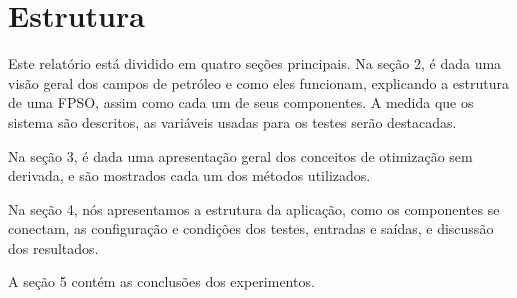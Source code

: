 \section{Estrutura}

Este relatório está dividido em quatro seções principais.
Na seção 2, é dada uma visão geral dos campos de petróleo e como eles funcionam, explicando a estrutura de uma FPSO, assim como cada um de seus componentes. A medida que os sistema são descritos, as variáveis usadas para os testes serão destacadas.

Na seção 3, é dada uma apresentação geral dos conceitos de otimização sem derivada, e são mostrados cada um dos métodos utilizados.

Na seção 4, nós apresentamos a estrutura da aplicação, como os componentes se conectam, as configuração e condições dos testes, entradas e saídas, e discussão dos resultados.

A seção 5 contém as conclusões dos experimentos.

 

